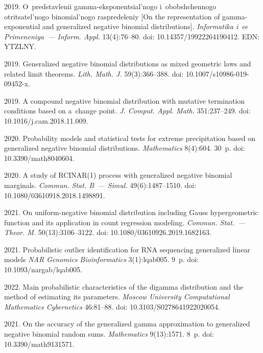 \begin{multicols}{2}
{{\begin{thebibliography}{99}
 2019. 
O~predstavlenii gamma-eksponentsial'nogo i~obobshchennogo otritsatel'nogo binomial'nogo raspredeleniy 
[On the representation of gamma-exponential and generalized negative binomial distributions].
\textit{Informatika i~ee Primeneniya~--- Inform. \mbox{Appl}.} 13(4):76--80.
doi: 10.14357/19922264190412. EDN: YTZLNY.


 2019. 
Generalized negative binomial distributions as mixed geometric laws and related limit theorems.
\textit{Lith. Math. J.} 59(3):366--388. doi: 10.1007/s10986-019-09452-x.

 2019.  
A compound negative binomial distribution with mutative termination conditions based on a~change point.
\textit{J. Comput. Appl. Math.} 351:237--249. doi: 10.1016/j.cam.2018.11.009.

 2020.
Probability models and statistical tests for extreme precipitation based on generalized negative binomial distributions.
\textit{Mathematics} 8(4):604. 30~p. doi: 10.3390/math8040604.

 2020. 
A study of RCINAR(1) process with generalized negative binomial marginals.
\textit{Commun. Stat. B~--- Simul.} 49(6):1487--1510.
doi: 10.1080/03610918.2018.1498891.

 2021. 
On uniform-negative binomial distribution including Gauss hypergeometric function and its application in count regression modeling.
\textit{Commun. Stat.~--- Theor. M.} 50(13):3106--3122. doi: 10.1080/03610926.2019.1682163.

  2021.
Probabilistic outlier identification for RNA sequencing generalized linear models
\textit{NAR Genomics Bioinformatics} 3(1):lqab005. 9~p. doi: 10.1093/nargab/lqab005.

 2022. 
Main probabilistic characteristics of the digamma distribution and the method of estimating its parameters.
\textit{Moscow University Computational Mathematics Cybernetics} 46:81--88. doi: 10.3103/S0278641922020054.

 2021.
On the accuracy of the generalized gamma approximation to generalized negative binomial random sums.
\textit{Mathematics} 9(13):1571. 8~p. doi: 10.3390/math9131571.


\end{thebibliography}}}
\end{multicols}
